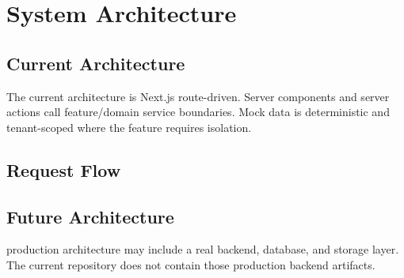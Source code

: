 \chapter{System Architecture}
\section{Current Architecture}

The current architecture is Next.js route-driven. Server components and server actions call feature/domain service boundaries. Mock data is deterministic and tenant-scoped where the feature requires isolation.

\section{Request Flow}


\section{Future Architecture}
\planned{} production architecture may include a real backend, database, and storage layer. The current repository does not contain those production backend artifacts.
